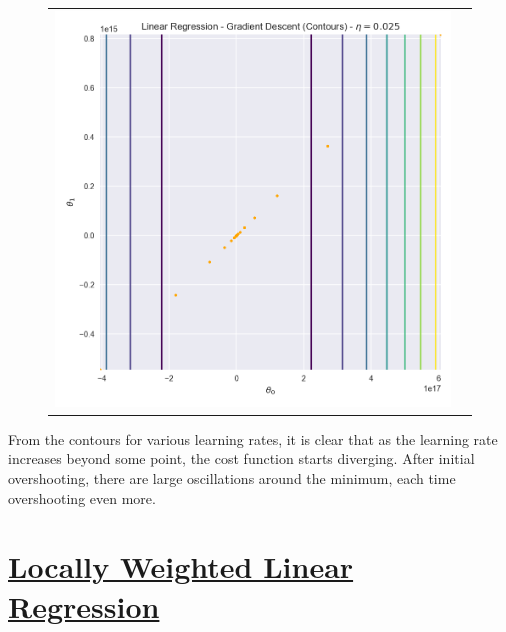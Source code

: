 \documentclass[12pt]{article}
\begin{document}
\begin{figure}[!htb]
\begin{tabular}{cc}
\includegraphics[scale=0.3]{linear10.png}
\end{tabular}
\end{figure}
\begin{addmargin}[0.3in]{0in}
From the contours for various learning rates, it is clear that as the learning rate increases beyond some point, the cost function starts diverging. After initial overshooting, there are large oscillations around the minimum, each time overshooting even more.
\end{addmargin}

\newpage
\section*{\underline{Locally Weighted Linear Regression}}
\end{document}
